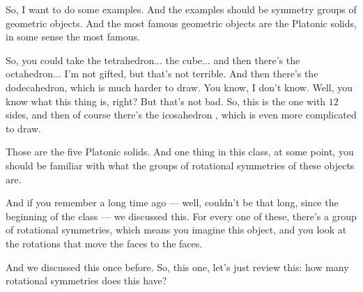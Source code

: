 \begin{speech}[00:32:32 - 00:34:15]
So, I want to do some examples. And the examples should be symmetry groups of geometric objects. And the most famous geometric objects are the Platonic solids, in some sense the most famous.

So, you could take the tetrahedron...  the cube...  and then there's the octahedron...  I'm not gifted, but that's not terrible. And then there's the dodecahedron, which is much harder to draw. You know, I don't know. Well, you know what this thing is, right? But that's not bad. So, this is the one with $12$ sides, and then of course there's the icosahedron , which is even more complicated to draw.

Those are the five Platonic solids. And one thing in this class, at some point, you should be familiar with what the groups of rotational symmetries of these objects are.

And if you remember a long time ago --- well, couldn't be that long, since the beginning of the class --- we discussed this. For every one of these, there's a group of rotational symmetries, which means you imagine this object, and you look at the rotations that move the faces to the faces.

And we discussed this once before. So, this one, let's just review this: how many rotational symmetries does this have? 
\end{speech}

